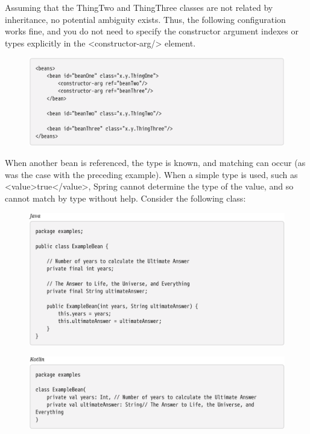 Assuming that the ThingTwo and ThingThree classes are not related by inheritance, no potential
ambiguity exists. Thus, the following configuration works fine, and you do not need to specify the
constructor argument indexes or types explicitly in the <constructor-arg/> element.

\begin{figure}[ht]
    \centering
    \includegraphics[width=1\linewidth]{./Figure/IMG_code_24.png}
\end{figure}

\newpage
When another bean is referenced, the type is known, and matching can occur (as was the case with
the preceding example). When a simple type is used, such as <value>true</value>, Spring cannot
determine the type of the value, and so cannot match by type without help. Consider the following
class:

\begin{figure}[ht]
    \centering
    \includegraphics[width=1\linewidth]{./Figure/IMG_code_25.png}
\end{figure}

\begin{figure}[ht]
    \centering
    \includegraphics[width=1\linewidth]{./Figure/IMG_code_26.png}
\end{figure}

